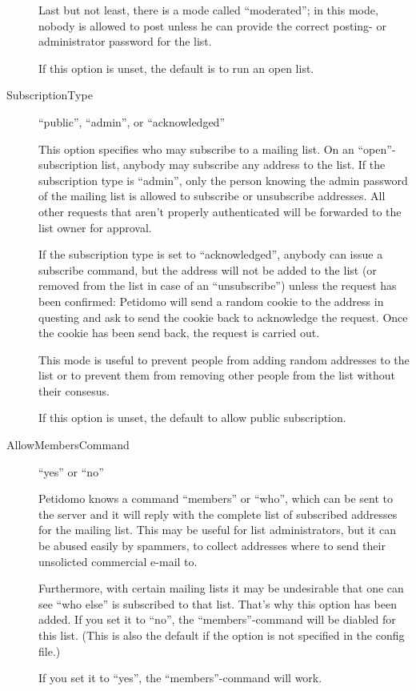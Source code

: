 \documentclass[a4paper,11pt]{scrreprt}
\begin{document}
\begin{description}
Last but not least, there is a mode called ``moderated''; in this
mode, nobody is allowed to post unless he can provide the correct
posting- or administrator password for the list.

If this option is unset, the default is to run an open list.

\item[SubscriptionType] \hfill ``public'', ``admin'', or ``acknowledged''

This option specifies who may subscribe to a mailing list. On an
``open''-subscription list, anybody may subscribe any address to the
list. If the subscription type is ``admin'', only the person knowing
the admin password of the mailing list is allowed to subscribe or
unsubscribe addresses. All other requests that aren't properly
authenticated will be forwarded to the list owner for approval.

If the subscription type is set to ``acknowledged'', anybody can issue
a subscribe command, but the address will not be added to the list (or
removed from the list in case of an ``unsubscribe'') unless the
request has been confirmed: Petidomo will send a random cookie to the
address in questing and ask to send the cookie back to acknowledge the
request. Once the cookie has been send back, the request is carried
out.

This mode is useful to prevent people from adding random addresses to
the list or to prevent them from removing other people from the list
without their consesus.

If this option is unset, the default to allow public subscription.

\item[AllowMembersCommand] \hfill ``yes'' or ``no''

Petidomo knows a command ``members'' or ``who'', which can be sent
to the server and it will reply with the complete list of subscribed
addresses for the mailing list. This may be useful for list
administrators, but it can be abused easily by spammers, to collect
addresses where to send their unsolicted commercial e-mail to.

Furthermore, with certain mailing lists it may be undesirable that one
can see ``who else'' is subscribed to that list. That's why this
option has been added. If you set it to ``no'', the
``members''-command will be diabled for this list. (This is also the
default if the option is not specified in the config file.)

If you set it to ``yes'', the ``members''-command will work.


\end{description}
\end{document}
